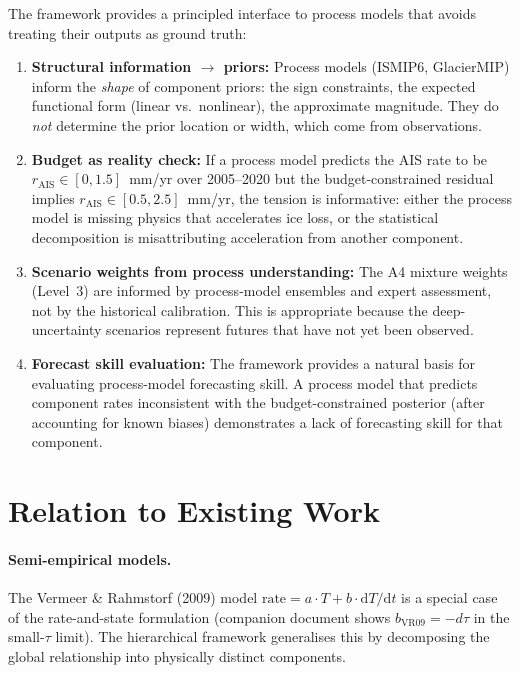 \documentclass[11pt]{article}
\begin{document}
The framework provides a principled interface to process models that avoids treating their outputs as ground truth:

\begin{enumerate}
  \item \textbf{Structural information $\to$ priors:} Process models (ISMIP6, GlacierMIP) inform the \emph{shape} of component priors: the sign constraints, the expected functional form (linear vs.\ nonlinear), the approximate magnitude.  They do \emph{not} determine the prior location or width, which come from observations.

  \item \textbf{Budget as reality check:} If a process model predicts the AIS rate to be $r_{\text{AIS}} \in [0, 1.5]$~mm/yr over 2005--2020 but the budget-constrained residual implies $r_{\text{AIS}} \in [0.5, 2.5]$~mm/yr, the tension is informative: either the process model is missing physics that accelerates ice loss, or the statistical decomposition is misattributing acceleration from another component.

  \item \textbf{Scenario weights from process understanding:} The A4 mixture weights (Level~3) are informed by process-model ensembles and expert assessment, not by the historical calibration.  This is appropriate because the deep-uncertainty scenarios represent futures that have not yet been observed.

  \item \textbf{Forecast skill evaluation:} The framework provides a natural basis for evaluating process-model forecasting skill.  A process model that predicts component rates inconsistent with the budget-constrained posterior (after accounting for known biases) demonstrates a lack of forecasting skill for that component.
\end{enumerate}


\section{Relation to Existing Work}
\label{sec:existing}

\paragraph{Semi-empirical models.}  The Vermeer \& Rahmstorf (2009) model $\text{rate} = a \cdot T + b \cdot \mathrm{d}T/\mathrm{d}t$ is a special case of the rate-and-state formulation (companion document shows $b_{\text{VR09}} = -d\tau$ in the small-$\tau$ limit).  The hierarchical framework generalises this by decomposing the global relationship into physically distinct components.
\end{document}
